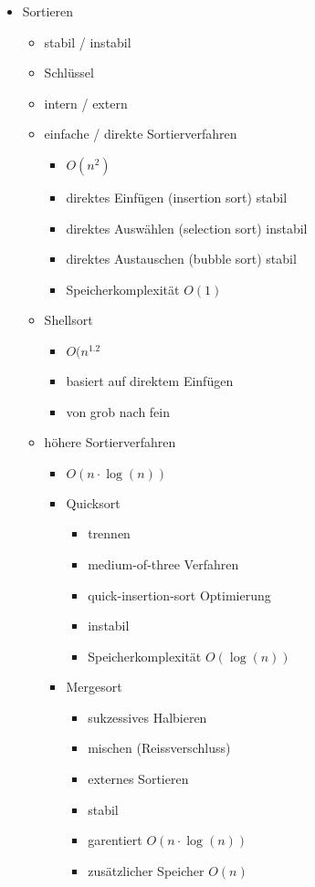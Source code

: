 \begin{itemize}
    \item Sortieren
    \begin{itemize}
        \item stabil / instabil
        \item Schlüssel
        \item intern / extern
        
        \item einfache / direkte Sortierverfahren
        \begin{itemize}
            \item $O(n^2)$
            \item direktes Einfügen (insertion sort)
            stabil
            \item direktes Auswählen (selection sort)
            instabil
            \item direktes Austauschen (bubble sort)
            stabil
            \item Speicherkomplexität $O(1)$
        \end{itemize}
        
        \item Shellsort
        \begin{itemize}
            \item $O(n^{1.2}$
            \item basiert auf direktem Einfügen
            \item von grob nach fein
        \end{itemize}
        
        \item höhere Sortierverfahren
        \begin{itemize}
            \item $O(n \cdot \log(n))$
            \item Quicksort
            \begin{itemize}
                \item trennen
                \item medium-of-three Verfahren
                \item quick-insertion-sort Optimierung
                \item instabil
                \item Speicherkomplexität $O(\log(n))$
            \end{itemize}
            \item Mergesort
            \begin{itemize}
                \item sukzessives Halbieren
                \item mischen (Reissverschluss)
                \item externes Sortieren
                \item stabil
                \item garentiert $O(n \cdot \log(n))$
                \item zusätzlicher Speicher $O(n)$
            \end{itemize}
        \end{itemize}
    \end{itemize}
    

\end{itemize}
